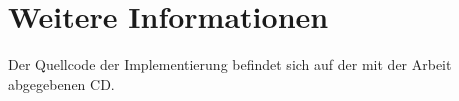 \chapter{Weitere Informationen}
Der Quellcode der Implementierung befindet sich auf der mit der Arbeit abgegebenen CD.